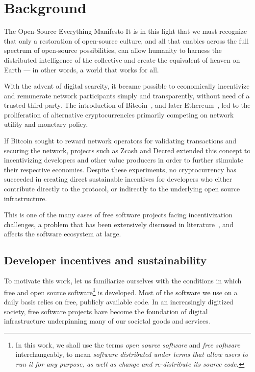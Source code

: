 \section{Background}

\begin{epigraph}{The Open-Source Everything Manifesto}
    \noindent It is in this light that we must recognize that only a restoration of
    open-source culture, and all that enables across the full spectrum of
    open-source possibilities, can allow humanity to harness the distributed
    intelligence of the collective and create the equivalent of heaven on Earth
    --- in other words, a world that works for all.
\end{epigraph}

\noindent With the advent of digital scarcity, it became possible to economically
incentivize and remunerate network participants simply and transparently,
without need of a trusted third-party. The introduction of
Bitcoin~\cite{bitcoin}, and later Ethereum~\cite{ethereum}, led to the
proliferation of alternative cryptocurrencies primarily competing on network
utility and monetary policy.

If Bitcoin sought to reward network operators for
validating transactions and securing the network, projects such as Zcash and
Decred extended this concept to incentivizing developers and other value producers
in order to further stimulate their respective economies. Despite these experiments,
no cryptocurrency has succeeded in creating direct sustainable incentives for
developers who either contribute directly to the protocol, or indirectly to the
underlying open source infrastructure.

This is one of the many cases of free software projects facing incentivization
challenges, a problem that has been extensively discussed in
literature~\cite{roads and bridges}, and affects the software ecosystem at large.

\subsection{Developer incentives and sustainability}
\label{s:incentives}

To motivate this work, let us familiarize ourselves with the
conditions in which free and open source software\footnote{In this work, we
shall use the terms \emph{open source software} and \emph{free software} interchangeably,
to mean \emph{software distributed under terms that allow users to run it
for any purpose, as well as change and re-distribute its source code.}}
is developed. Most of the software we use on a daily basis relies on free,
publicly available code. In an increasingly digitized society, free software
projects have become the foundation of digital infrastructure underpinning many
of our societal goods and services.

